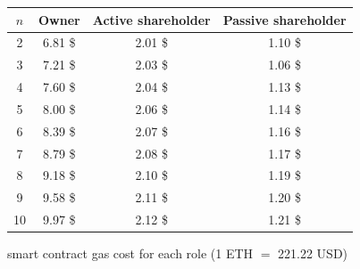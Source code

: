 \begin{figure}[t]
	\centering
		\begin{tabular}[b]{| c | c | c | c | }	
			\hline
			$n$ &	Owner & Active shareholder & Passive shareholder
			\\	\hline \hline
			2&	6.81 \$&	2.01 \$&	1.10 \$
			\\	\hline
			3&	7.21 \$&	2.03 \$&	1.06 \$
			\\	\hline
			4&	7.60 \$&	2.04 \$&	1.13 \$
			\\	\hline
			5&	8.00 \$&	2.06 \$&	1.14 \$
			\\	\hline
			6&	8.39 \$&	2.07 \$&	1.16 \$
			\\	\hline
			7&	8.79 \$&	2.08 \$&	1.17 \$
			\\	\hline
			8&	9.18 \$&	2.10 \$&	1.19 \$
			\\	\hline
			9&	9.58 \$&	2.11 \$&	1.20 \$
			\\	\hline
			10&	9.97 \$&	2.12 \$&	1.21 \$
			\\	\hline
			
		\end{tabular}

	\caption{\shortname smart contract gas cost for each role (1 ETH $=$ 221.22 USD)}	
	\label{fig:costfigs}	
\end{figure}
